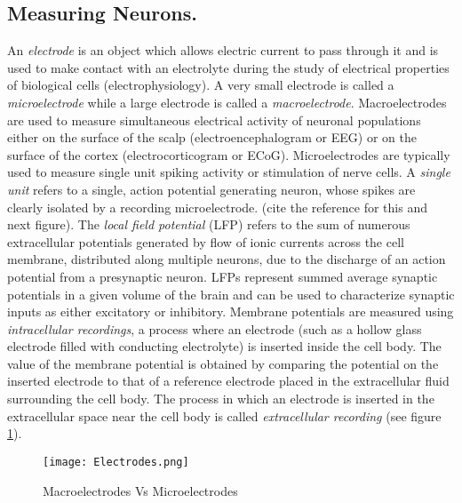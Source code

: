 \subsection{Measuring Neurons.}
An \textit{electrode} is an object  which allows electric current to pass through it
and is used to make contact with an electrolyte during the study of electrical properties
of biological cells (electrophysiology). 
A very small electrode is called a \textit{microelectrode} while a large electrode
is called a \textit{macroelectrode}.
Macroelectrodes are used to measure simultaneous electrical activity of neuronal populations
either on the surface of the scalp (electroencephalogram or EEG) or on the surface of the cortex (electrocorticogram or ECoG). Microelectrodes are typically used to measure 
single unit spiking activity or stimulation of nerve cells.
A \textit{single unit} refers to a single, action potential generating neuron, whose spikes are clearly isolated by a recording microelectrode. (cite the reference for this and next figure).
The \textit{local field potential} (LFP) refers to the sum of numerous extracellular potentials
generated by flow of ionic currents across the cell membrane, distributed along multiple neurons, due to the discharge of an action potential from a presynaptic neuron.
LFPs represent summed average synaptic potentials in a given volume of the brain and can
be used to characterize synaptic inputs as either excitatory or inhibitory.
Membrane potentials are measured using \textit{intracellular recordings}, a process where an electrode (such as a hollow glass electrode filled with conducting electrolyte) is inserted inside the cell body. The value of the membrane potential is obtained by comparing the potential on the inserted electrode to that of a reference electrode placed in the extracellular fluid surrounding the cell body.  The process in which an electrode is inserted in the extracellular space near the cell body is called \textit{extracellular recording} (see figure  \ref{fig:Electrodes}).

\begin{figure}[h]
\caption{Macroelectrodes Vs Microelectrodes}
\texttt{[image: Electrodes.png]}
      \label{fig:Electrodes}
\end{figure}

